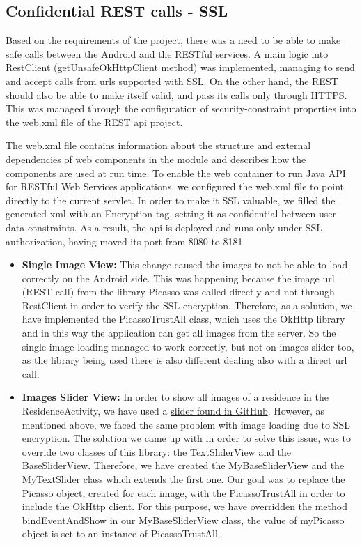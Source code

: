 \documentclass[12pt]{article}
\begin{document}
	\subsection{Confidential REST calls - SSL}
	Based on the requirements of the project, there was a need to be able to make safe calls between the Android and the RESTful services. A main logic into RestClient (getUnsafeOkHttpClient method) was implemented, managing to send and accept calls from urls supported with SSL. On the other hand, the REST should also be able to make itself valid, and pass its calls only through HTTPS. This was managed through the configuration of security-constraint properties into the web.xml file of the REST api project.
	
	The web.xml file contains information about the structure and external dependencies of web components in the module and describes how the components are used at run time. To enable the web container to run Java API for RESTful Web Services applications, we configured the web.xml file to point directly to the current servlet. In order to make it SSL valuable, we filled the generated xml with an Encryption tag, setting it as confidential between user data constraints. As a result, the api is deployed and runs only under SSL authorization, having moved its port from 8080 to 8181.
	
	\begin{itemize}
		\item\textbf{Single Image View:} This change caused the images to not be able to load correctly on the Android side. This was happening because the image url (REST call) from the library Picasso was called directly and not through RestClient in order to verify the SSL encryption. Therefore, as a solution, we have implemented the PicassoTrustAll class, which uses the OkHttp library and in this way the application can get all images from the server. So the single image loading managed to work correctly, but not on images slider too, as the library being used there is also different dealing also with a direct url call.
		
		\item\textbf{Images Slider View:} In order to show all images of a residence in the ResidenceActivity, we have used a \href{https://github.com/daimajia/AndroidImageSlider}{slider found in GitHub}. However, as mentioned above, we faced the same problem with image loading due to SSL encryption. The solution we came up with in order to solve this issue, was to override two classes of this library: the TextSliderView and the BaseSliderView. Therefore, we have created the MyBaseSliderView and the MyTextSlider class which extends the first one. Our goal was to replace the Picasso object, created for each image, with the PicassoTrustAll in order to include the OkHttp client. For this purpose, we have overridden the method bindEventAndShow in our MyBaseSliderView class, the value of myPicasso object is set to an instance of PicassoTrustAll.
	\end{itemize}
	
\end{document}
